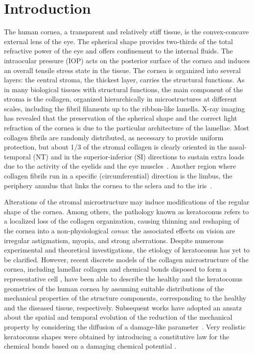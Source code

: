 \documentclass[preprint,12pt]{elsarticle}
\begin{document}
\date{\today}



\section{Introduction}
\label{sec:introduction}

The human cornea, a transparent and relatively stiff tissue, is the convex-concave external lens of the eye. The spherical shape provides two-thirds of the total refractive power of the eye and offers confinement to the internal fluids. The intraocular pressure (IOP) acts on the posterior surface of the cornea and induces an overall tensile stress state in the tissue. The cornea is organized into several layers: the central stroma, the thickest layer, carries the structural functions. As in many biological tissues with structural functions, the main component of the stroma is the collagen, organized hierarchically in microstructures at different scales, including the fibril filaments up to the ribbon-like lamella. X-ray imaging has revealed that the preservation of the spherical shape and the correct light refraction of the cornea is due to the particular architecture of the lamellae. Most collagen fibrils are randomly distributed, as necessary to provide uniform protection, but about 1/3 of the stromal collagen is clearly oriented in the nasal-temporal (NT) and in the superior-inferior (SI) directions to sustain extra loads due to the activity of the eyelids and the eye muscles~\cite{meek:2009}. Another region where collagen fibrils run in a specific (circumferential) direction is the limbus, the periphery annulus that links the cornea to the sclera and to the iris~\cite{kokott1938mechanisch}.   

Alterations of the stromal microstructure may induce modifications of the regular shape of the cornea. Among others, the pathology known as keratoconus refers to a localized loss of the collagen organization, causing thinning and reshaping of the cornea into a non-physiological \emph{conus}: the associated effects on vision are irregular astigmatism, myopia, and strong aberrations. Despite numerous experimental and theoretical investigations, the etiology of keratoconus has yet to be clarified. However, recent discrete models of the collagen microstructure of the cornea, including lamellar collagen and chemical bonds disposed to form a representative cell \cite{pandolfi:2019}, have been able to describe the healthy and the keratoconus geometries of the human cornea by assuming suitable distributions of the mechanical properties of the structure components, corresponding to the healthy and the diseased tissue, respectively. Subsequent works have adopted an ansatz about the spatial and temporal evolution of the reduction of the mechanical property by considering the diffusion of a damage-like parameter~\cite{Gizzi:2018aa}. Very realistic keratoconus shapes were obtained by introducing a constitutive law for the chemical bonds based on a damaging chemical potential \cite{pandolfi2022modeling}.
\end{document}
